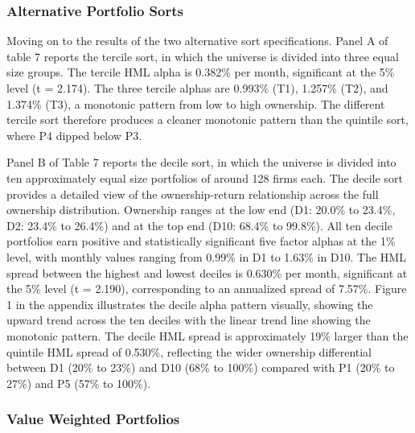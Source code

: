 


\subsubsection{Alternative Portfolio Sorts}

Moving on to the results of the two alternative sort specifications. Panel A of table 7 reports the tercile sort, in which the universe is divided into three equal size groups. The tercile HML alpha is 0.382\% per month, significant at the 5\% level (t = 2.174). The three tercile alphas are 0.993\% (T1), 1.257\% (T2), and 1.374\% (T3), a monotonic pattern from low to high ownership. The different tercile sort therefore produces a cleaner monotonic pattern than the quintile sort, where P4 dipped below P3.

Panel B of Table 7 reports the decile sort, in which the universe is divided into ten approximately equal size portfolios of around 128 firms each. The decile sort provides a detailed view of the ownership-return relationship across the full ownership distribution. Ownership ranges at the low end (D1: 20.0\% to 23.4\%, D2: 23.4\% to 26.4\%) and at the top end (D10: 68.4\% to 99.8\%). All ten decile portfolios earn positive and statistically significant five factor alphas at the 1\% level, with monthly values ranging from 0.99\% in D1 to 1.63\% in D10. The HML spread between the highest and lowest deciles is 0.630\% per month, significant at the 5\% level (t = 2.190), corresponding to an annualized spread of 7.57\%. Figure 1 in the appendix illustrates the decile alpha pattern visually, showing the upward trend across the ten deciles with the linear trend line showing the monotonic pattern. The decile HML spread is approximately 19\% larger than the quintile HML spread of 0.530\%, reflecting the wider ownership differential between D1 (20\% to 23\%) and D10 (68\% to 100\%) compared with P1 (20\% to 27\%) and P5 (57\% to 100\%).




\subsubsection{Value Weighted Portfolios}

